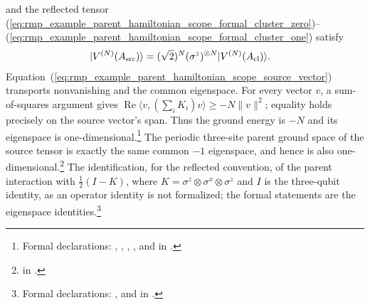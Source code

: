 \documentclass{article}
\begin{document}
and the reflected tensor
(\ref{eq:rmp_example_parent_hamiltonian_scope_formal_cluster_zero})--(\ref{eq:rmp_example_parent_hamiltonian_scope_formal_cluster_one})
satisfy
\begin{align}
    |V^{(N)}(A_{\mathrm{src}})\rangle
    &=(\sqrt2)^N(\sigma^z)^{\otimes N}|V^{(N)}(A_{\mathrm{cl}})\rangle.
    \label{eq:rmp_example_parent_hamiltonian_scope_source_vector}
\end{align}
Equation~(\ref{eq:rmp_example_parent_hamiltonian_scope_source_vector})
transports nonvanishing and the common eigenspace. For every vector $v$, a
sum-of-squares argument gives
$\operatorname{Re}\langle v,(\sum_i K_i)v\rangle\ge -N\|v\|^2$;
equality holds precisely on the source vector's span. Thus the ground energy
is $-N$ and its eigenspace is one-dimensional.\footnote{Formal declarations:
,
,
,
, and
 in
.}
The periodic three-site parent ground space of the source tensor is exactly
the same common $-1$ eigenspace, and hence is also one-dimensional.\footnote{
 in
.} The
identification, for the reflected convention,
of the parent interaction with $\tfrac12(I-K)$, where
$K=\sigma^z\otimes\sigma^x\otimes\sigma^z$ and $I$ is the three-qubit identity,
as an operator identity is not
formalized; the formal statements are the eigenspace
identities.\footnote{Formal declarations:
,
 and
 in
.}
\end{document}
